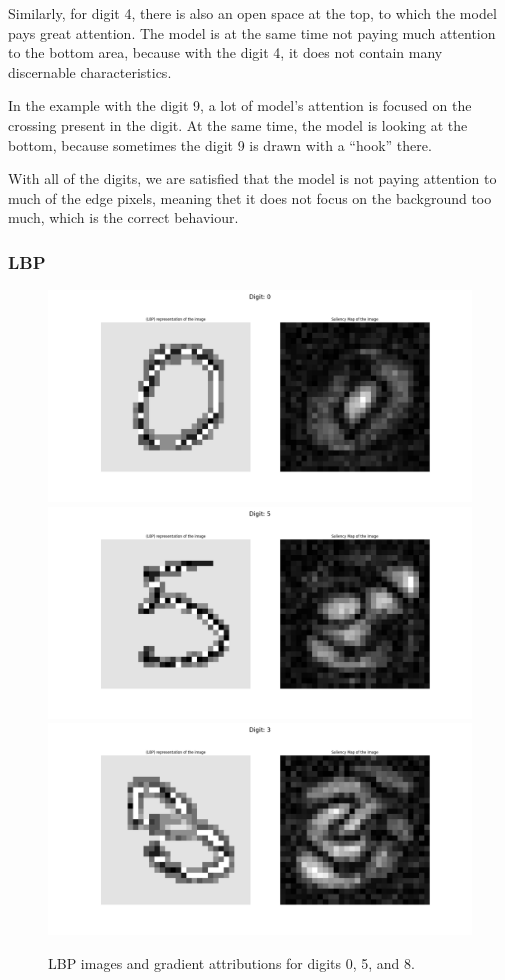 \documentclass[journal, a4paper]{IEEEtran}
\begin{document}
Similarly, for digit 4, there is also an open space at the top, to which the model pays great attention.
The model is at the same time not paying much attention to the bottom area, because with the digit 4, it does not contain many discernable characteristics.

In the example with the digit 9, a lot of model's attention is focused on the crossing present in the digit. At the same time, the model is looking at the bottom, because sometimes the digit 9 is drawn with a ``hook'' there.

With all of the digits, we are satisfied that the model is not paying attention to much of the edge pixels, meaning thet it does not focus on the background too much,
which is the correct behaviour.

\subsubsection{LBP}

\begin{figure}[ht]\centering
    \includegraphics[width=.6\linewidth]{img/saliency_lbp/0}
    \includegraphics[width=.6\linewidth]{img/saliency_lbp/5}
    \includegraphics[width=.6\linewidth]{img/saliency_lbp/8}
    \caption{LBP images and gradient attributions for digits 0, 5, and 8.}\label{fig:lbp-attributions}
\end{figure}
\end{document}
